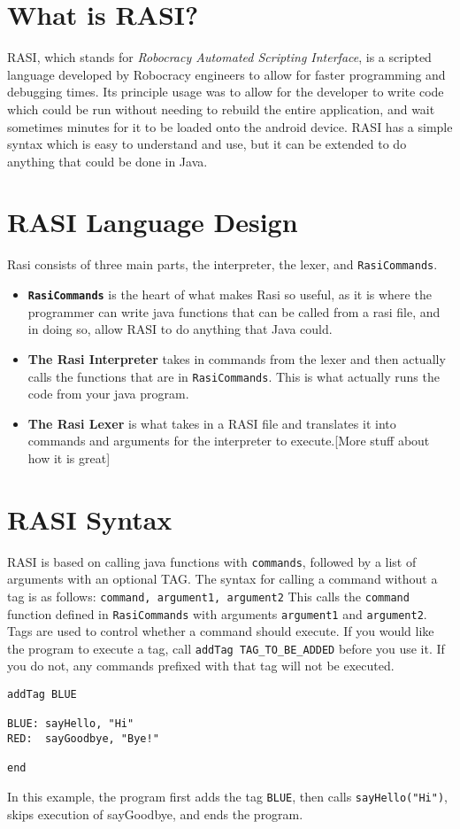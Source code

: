 \documentclass{article}
\begin{document}
\section{What is RASI?}
RASI, which stands for \textit{Robocracy Automated Scripting Interface}, is a scripted language developed by Robocracy engineers to allow for faster programming and debugging times. Its principle usage was to allow for the developer to write code which could be run without needing to rebuild the entire application, and wait sometimes minutes for it to be loaded onto the android device. RASI has a simple syntax which is easy to understand and use, but it can be extended to do anything that could be done in Java.

\section{RASI Language Design}
Rasi consists of three main parts, the interpreter, the lexer, and \texttt{RasiCommands}.
\begin{itemize}
  \item \textbf{\texttt{RasiCommands}} is the heart of what makes Rasi so useful, as it is where the programmer can write java functions that can be called from a rasi file, and in doing so, allow RASI to do anything that Java could.
  \item \textbf{The Rasi Interpreter} takes in commands from the lexer and then actually calls the functions that are in \texttt{RasiCommands}. This is what actually runs the code from your java program.
  \item \textbf{The Rasi Lexer} is what takes in a RASI file and translates it into commands and arguments for the interpreter to execute.[More stuff about how it is great]
\end{itemize}

\section{RASI Syntax}
RASI is based on calling java functions with \texttt{commands}, followed by a list of arguments with an optional TAG.
The syntax for calling a command without a tag is as follows: \texttt{command, argument1, argument2} This calls the \texttt{command} function defined in \texttt{RasiCommands} with arguments \texttt{argument1} and \texttt{argument2}.
Tags are used to control whether a command should execute. If you would like the program to execute a tag, call \texttt{addTag TAG\_TO\_BE\_ADDED} before you use it. If you do not, any commands prefixed with that tag will not be executed.

\begin{verbatim}
addTag BLUE

BLUE: sayHello, "Hi"
RED:  sayGoodbye, "Bye!"

end
\end{verbatim}
In this example, the program first adds the tag \texttt{BLUE}, then calls \texttt{sayHello("Hi")}, skips execution of sayGoodbye, and ends the program.
\end{document}
